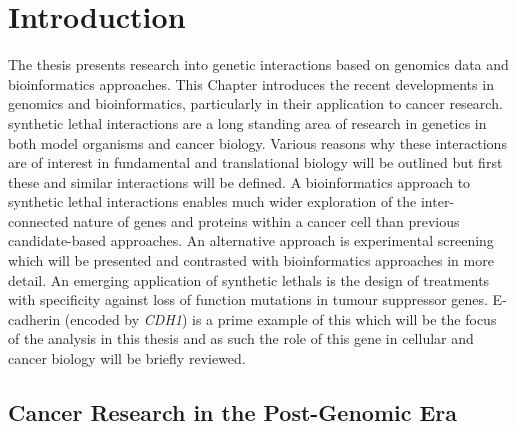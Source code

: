 \chapter{Introduction}
\label{chap:intro}



The thesis presents research into genetic interactions based on \gls{genomics} data and \gls{bioinformatics} approaches. This Chapter introduces the recent developments in \gls{genomics} and \gls{bioinformatics}, particularly in their application to cancer research. \Gls{synthetic lethal} interactions are a long standing area of research in genetics in both model organisms and cancer biology. Various reasons why these interactions are of interest in fundamental and translational biology will be outlined but first these and similar interactions will be defined. A \gls{bioinformatics} approach to \gls{synthetic lethal} interactions enables much wider exploration of the inter-connected nature of genes and proteins within a cancer cell than previous candidate-based approaches. An alternative approach is experimental screening which will be presented and contrasted with \gls{bioinformatics} approaches in more detail.  An emerging application of \glspl{synthetic lethal} is the design of treatments with specificity against loss of function mutations in tumour suppressor genes. \gls{E-cadherin} (encoded by \textit{CDH1}) is a prime example of this which will be the focus of the analysis in this thesis and as such the role of this gene in cellular and cancer biology will be briefly reviewed.   



\section{Cancer Research in the Post-Genomic Era}

